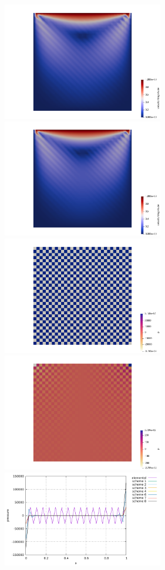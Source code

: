\begin{center}
\includegraphics[width=7cm]{python_codes/fieldstone_12/results/ldc32/vel}
\includegraphics[width=7cm]{python_codes/fieldstone_12/results/ldc33/vel}\\
\includegraphics[width=7cm]{python_codes/fieldstone_12/results/ldc32/p}
\includegraphics[width=7cm]{python_codes/fieldstone_12/results/ldc33/p}\\
\includegraphics[width=7cm]{python_codes/fieldstone_12/results/ldc32/p_top}

\end{center}

